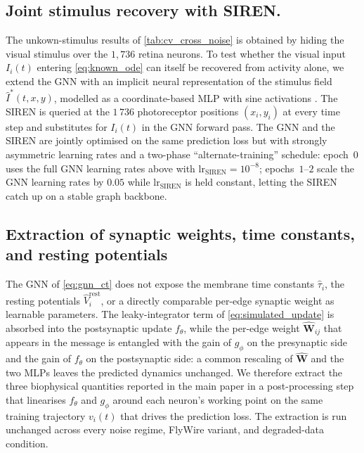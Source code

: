 \documentclass{article}
\begin{document}




\subsection{Joint stimulus recovery with SIREN.}
\label{app:SIREN}
The unkown-stimulus results of \cref{tab:cv_cross_noise} is obtained by hiding the visual stimulus over the $1{,}736$ retina neurons. To test whether the visual input $I_i(t)$ entering \cref{eq:known_ode} can itself be recovered from activity alone, we extend the GNN with an implicit neural representation of the stimulus field $\hat I^*(t,x,y)$, modelled as a coordinate-based
MLP with sine activations \citep[SIREN,][input size~$=3$,
hidden dimension~$=2048$, $4$ hidden layers, output size~$=1$,
$\omega_0\!=\!4096$, outermost-linear head]{sitzmann_implicit_2020}.
The SIREN is queried at the $1\,736$ photoreceptor positions
$(x_i,y_i)$ at every time step and substitutes for $I_i(t)$ in the
GNN forward pass. The GNN and the SIREN are jointly optimised on the
same prediction loss but with strongly asymmetric learning rates
and a two-phase ``alternate-training'' schedule: epoch~$0$ uses the
full GNN learning rates above with
$\text{lr}_\text{SIREN}\!=\!10^{-8}$; epochs~$1$–$2$ scale the GNN
learning rates by $0.05$ while $\text{lr}_\text{SIREN}$ is held
constant, letting the SIREN catch up on a stable graph backbone.


\subsection{Extraction of synaptic weights, time constants, and resting potentials}
\label{app:extraction}

The GNN of \cref{eq:gnn_ct} does not expose the membrane time
constants $\hat\tau_i$, the resting potentials
$\hat V^{\mathrm{rest}}_i$, or a directly comparable per-edge
synaptic weight as learnable parameters. The leaky-integrator term
of \cref{eq:simulated_update} is absorbed into the postsynaptic
update $f_\theta$, while the per-edge weight $\hat{\mathbf{W}}_{ij}$
that appears in the message is entangled with the gain of $g_\phi$
on the presynaptic side and the gain of $f_\theta$ on the
postsynaptic side: a common rescaling of $\hat{\mathbf{W}}$ and the
two MLPs leaves the predicted dynamics unchanged. We therefore
extract the three biophysical quantities reported in the main paper
in a post-processing step that linearises $f_\theta$ and $g_\phi$
around each neuron's working point on the same training trajectory
$v_i(t)$ that drives the prediction loss. The extraction is run
unchanged across every noise regime, FlyWire variant, and
degraded-data condition.
\end{document}
